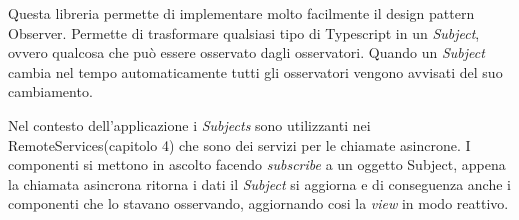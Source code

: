 Questa libreria permette di implementare molto facilmente il design pattern \gls{Observer}. Permette di trasformare qualsiasi tipo di Typescript in un \emph{Subject}, ovvero qualcosa che può essere osservato dagli osservatori. Quando un \emph{Subject} cambia nel tempo automaticamente tutti gli osservatori vengono avvisati del suo cambiamento. 

Nel contesto dell'applicazione i \emph{Subjects} sono utilizzanti nei  RemoteServices(capitolo 4) che sono dei servizi per le chiamate asincrone. I componenti si mettono in ascolto facendo \emph{subscribe} a un oggetto Subject, appena la chiamata asincrona ritorna i dati il \emph{Subject} si aggiorna e di conseguenza anche i componenti che lo stavano osservando, aggiornando cosi la \emph{view} in modo reattivo. 